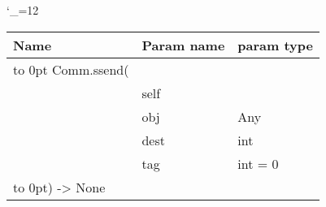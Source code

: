 \begingroup \catcode`\_=12 \tt
\begin{tabular}{lll}
\toprule
\textrm{Name}&\textrm{Param name}&\textrm{param type}\\
\midrule
\hbox to 0pt {Comm.ssend(\hss}\\
& self\\
& obj & Any\\
& dest & int\\
& tag & int = 0\\
\hbox to 0pt{) -> None\hss}\\
\bottomrule
\end{tabular}
\endgroup
